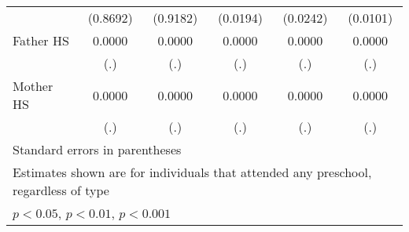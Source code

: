 \begin{table}[htbp]
\begin{tabular}{l*{5}{c}}
            &    (0.8692)         &    (0.9182)         &    (0.0194)         &    (0.0242)         &    (0.0101)         \\
\addlinespace
Father HS   &      0.0000         &      0.0000         &      0.0000         &      0.0000         &      0.0000         \\
            &         (.)         &         (.)         &         (.)         &         (.)         &         (.)         \\
\addlinespace
Mother HS   &      0.0000         &      0.0000         &      0.0000         &      0.0000         &      0.0000         \\
            &         (.)         &         (.)         &         (.)         &         (.)         &         (.)         \\
\bottomrule
\multicolumn{6}{l}{\footnotesize Standard errors in parentheses}\\
\multicolumn{6}{l}{\footnotesize Estimates shown are for individuals that attended any preschool, regardless of type}\\
\multicolumn{6}{l}{\footnotesize \sym{*} \(p<0.05\), \sym{**} \(p<0.01\), \sym{***} \(p<0.001\)}\\
\end{tabular}
\end{table}
